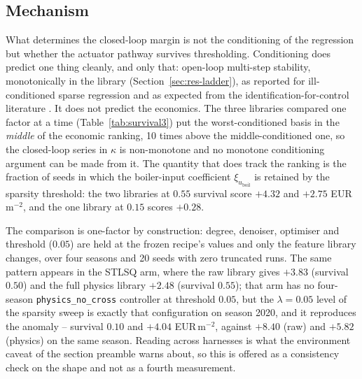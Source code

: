 \subsection{Mechanism}
\label{sec:res-mech}

What determines the closed-loop margin is not the conditioning of the regression but
whether the actuator pathway survives thresholding. Conditioning does predict one thing
cleanly, and only that: open-loop multi-step stability, monotonically in the library
(Section~\ref{sec:res-ladder}), as reported for ill-conditioned sparse regression
\cite{cortiella2021} and as expected from the identification-for-control literature
\cite{gevers1993,vandenhof1995}. It does not predict the economics. The three libraries
compared one factor at a time (Table~\ref{tab:survival3}) put the worst-conditioned basis
in the \emph{middle} of the economic ranking, 10 times above the middle-conditioned one,
so the closed-loop series in $\kappa$ is non-monotone and no monotone conditioning
argument can be made from it. The quantity that does track the ranking is the fraction of
seeds in which the boiler-input coefficient $\xi_{u_{\mathrm{boil}}}$ is retained by the
sparsity threshold: the two libraries at $0.55$ survival score $+4.32$ and $+2.75$
EUR\,m$^{-2}$, and the one library at $0.15$ scores $+0.28$.

The comparison is one-factor by construction: degree, denoiser, optimiser and threshold
($0.05$) are held at the frozen recipe's values and only the feature library changes, over
four seasons and 20 seeds with zero truncated runs. The same pattern appears in the STLSQ
arm, where the raw library gives $+3.83$ (survival $0.50$) and the full physics library
$+2.48$ (survival $0.55$); that arm has no four-season \texttt{physics\_no\_cross}
controller at threshold $0.05$, but the $\lambda = 0.05$ level of the sparsity sweep is
exactly that configuration on season 2020, and it reproduces the anomaly -- survival
$0.10$ and $+4.04$ EUR\,m$^{-2}$, against $+8.40$ (raw) and $+5.82$ (physics) on the same
season. Reading across harnesses is what the environment caveat of the section preamble
warns about, so this is offered as a consistency check on the shape and not as a fourth
measurement.

